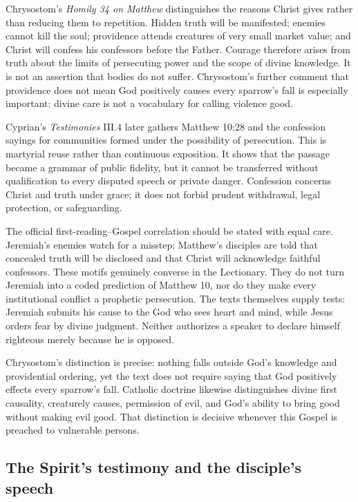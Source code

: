 \begin{deepstudy}
Chrysostom's \emph{Homily 34 on Matthew} distinguishes the reasons Christ gives rather than reducing them to repetition. Hidden truth will be manifested; enemies cannot kill the soul; providence attends creatures of very small market value; and Christ will confess his confessors before the Father. Courage therefore arises from truth about the limits of persecuting power and the scope of divine knowledge. It is not an assertion that bodies do not suffer. Chrysostom's further comment that providence does not mean God positively causes every sparrow's fall is especially important: divine care is not a vocabulary for calling violence good.

Cyprian's \emph{Testimonies} III.4 later gathers Matthew 10:28 and the confession sayings for communities formed under the possibility of persecution. This is martyrial reuse rather than continuous exposition. It shows that the passage became a grammar of public fidelity, but it cannot be transferred without qualification to every disputed speech or private danger. Confession concerns Christ and truth under grace; it does not forbid prudent withdrawal, legal protection, or safeguarding.

The official first-reading--Gospel correlation should be stated with equal care. Jeremiah's enemies watch for a misstep; Matthew's disciples are told that concealed truth will be disclosed and that Christ will acknowledge faithful confessors. These motifs genuinely converse in the Lectionary. They do not turn Jeremiah into a coded prediction of Matthew 10, nor do they make every institutional conflict a prophetic persecution. The texts themselves supply tests: Jeremiah submits his cause to the God who sees heart and mind, while Jesus orders fear by divine judgment. Neither authorizes a speaker to declare himself righteous merely because he is opposed.

Chrysostom's distinction is precise: nothing falls outside God's knowledge and providential ordering, yet the text does not require saying that God positively effects every sparrow's fall. Catholic doctrine likewise distinguishes divine first causality, creaturely causes, permission of evil, and God's ability to bring good without making evil good. That distinction is decisive whenever this Gospel is preached to vulnerable persons.

\subsection*{The Spirit's testimony and the disciple's speech\enspace{}}


\end{deepstudy}
